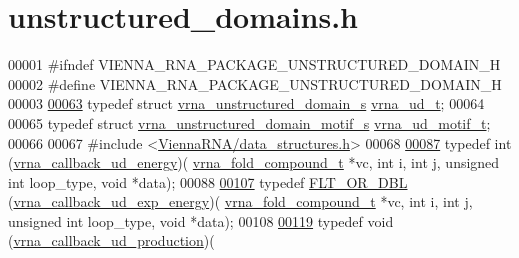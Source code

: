 \hypertarget{unstructured__domains_8h_source}{}\section{unstructured\+\_\+domains.\+h}
\label{unstructured__domains_8h_source}

\begin{DoxyCode}
00001 \textcolor{preprocessor}{#ifndef VIENNA\_RNA\_PACKAGE\_UNSTRUCTURED\_DOMAIN\_H}
00002 \textcolor{preprocessor}{#define VIENNA\_RNA\_PACKAGE\_UNSTRUCTURED\_DOMAIN\_H}
00003 
\hyperlink{group__domains__up_ga0009117b14d29143e8b18ab891f48c2d}{00063} \textcolor{keyword}{typedef} \textcolor{keyword}{struct }\hyperlink{group__domains__up_structvrna__unstructured__domain__s}{vrna\_unstructured\_domain\_s}  \hyperlink{group__domains__up_structvrna__unstructured__domain__s}{vrna\_ud\_t};
00064 
00065 \textcolor{keyword}{typedef} \textcolor{keyword}{struct }\hyperlink{structvrna__unstructured__domain__motif__s}{vrna\_unstructured\_domain\_motif\_s}  
      \hyperlink{structvrna__unstructured__domain__motif__s}{vrna\_ud\_motif\_t};
00066 
00067 \textcolor{preprocessor}{#include <\hyperlink{data__structures_8h}{ViennaRNA/data\_structures.h}>}
00068 
\hyperlink{group__domains__up_ga75825c57d0bfde4ae4f95c044260c5c3}{00087} \textcolor{keyword}{typedef} int (\hyperlink{group__domains__up_ga75825c57d0bfde4ae4f95c044260c5c3}{vrna\_callback\_ud\_energy})(
      \hyperlink{group__fold__compound_structvrna__fc__s}{vrna\_fold\_compound\_t} *vc, \textcolor{keywordtype}{int} i, \textcolor{keywordtype}{int} j, \textcolor{keywordtype}{unsigned} \textcolor{keywordtype}{int} loop\_type, \textcolor{keywordtype}{void} *data);
00088 
\hyperlink{group__domains__up_ga861706f257ba993753464b823e65b86e}{00107} \textcolor{keyword}{typedef} \hyperlink{group__data__structures_ga31125aeace516926bf7f251f759b6126}{FLT\_OR\_DBL} (\hyperlink{group__domains__up_ga861706f257ba993753464b823e65b86e}{vrna\_callback\_ud\_exp\_energy})(
      \hyperlink{group__fold__compound_structvrna__fc__s}{vrna\_fold\_compound\_t} *vc, \textcolor{keywordtype}{int} i, \textcolor{keywordtype}{int} j, \textcolor{keywordtype}{unsigned} \textcolor{keywordtype}{int} loop\_type, \textcolor{keywordtype}{void} *data);
00108 
\hyperlink{group__domains__up_ga4fdfc02c1b660c07f2d887772f02a0a1}{00119} \textcolor{keyword}{typedef} void (\hyperlink{group__domains__up_ga4fdfc02c1b660c07f2d887772f02a0a1}{vrna\_callback\_ud\_production})(

\end{DoxyCode}
